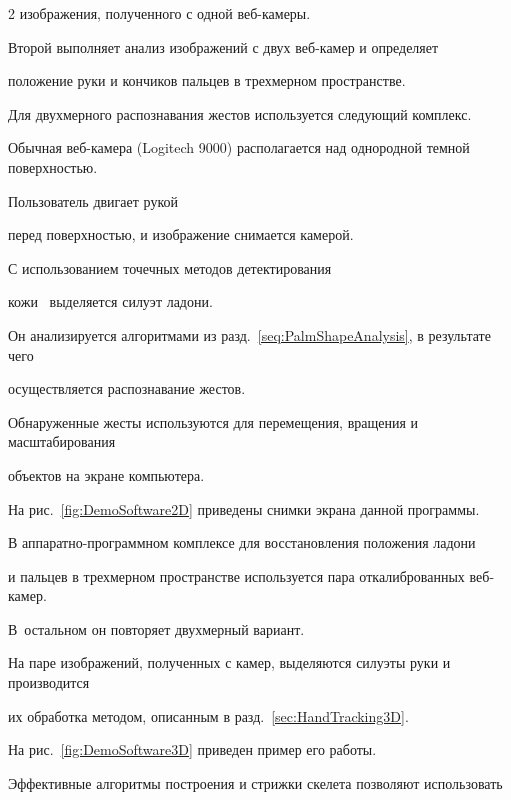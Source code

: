 \begin{multicols}{2}
изображения, полученного с одной веб-ка\-ме\-ры.


Второй выполняет анализ изображений с двух веб-ка\-мер и определяет 


положение руки и кончиков пальцев в трехмерном пространстве.





Для двухмерного распознавания жестов используется следующий комплекс.


Обычная веб-ка\-ме\-ра (Logitech 9000) располагается над однородной темной по\-верх\-ностью.


Пользователь двигает рукой\linebreak


 перед поверхностью, и изображение снимается камерой.


С использованием точечных методов детектирования 


кожи~\cite{PixelBaseSkinSurveyGraphicon,SkinSegmentaionComparison} выделяется силуэт ладони.


Он анализируется алгоритмами из разд.~\ref{seq:PalmShapeAnalysis}, в результате чего 


осуществляется распознавание жес\-тов.


Обнаруженные жесты используются для перемещения, вращения и масштабирования 


объектов на экране компьютера.


На рис.~\ref{fig:DemoSoftware2D} приведены снимки экрана данной программы.











В аппаратно-программном комплексе для восстановления положения ладони 


и пальцев в трехмерном пространстве используется пара отка\-либ\-ро\-ван\-ных веб-ка\-мер.


В~остальном он повторяет двухмерный вариант.


На паре изображений, полученных с камер, выделяются силуэты руки и производится 


их обработка методом, описанным в разд.~\ref{sec:HandTracking3D}.


На рис.~\ref{fig:DemoSoftware3D} приведен пример его работы.








Эффективные алгоритмы построения и стрижки скелета позволяют использовать 



\end{multicols}
